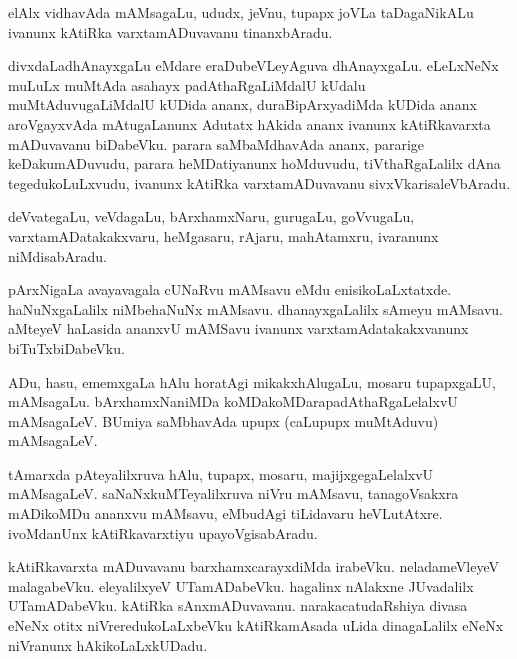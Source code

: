 \documentclass{article}
\begin{document}
\begin{mn}%
elAlx vidhavAda mAMsagaLu, ududx, jeVnu, tupapx joVLa taDagaNikALu ivanunx kAtiRka varxtamADuvavanu 
tinanxbAradu.
\end{mn}

\begin{mn}%
divxdaLadhAnayxgaLu eMdare eraDubeVLeyAguva dhAnayxgaLu. eLeLxNeNx muLuLx muMtAda asahayx 
padAthaRgaLiMdalU kUdalu muMtAduvugaLiMdalU kUDida ananx, duraBipArxyadiMda kUDida ananx 
aroVgayxvAda mAtugaLanunx Adutatx hAkida ananx ivanunx kAtiRkavarxta mADuvavanu biDabeVku. parara 
saMbaMdhavAda ananx, pararige keDakumADuvudu, parara heMDatiyanunx hoMduvudu, tiVthaRgaLalilx dAna 
tegedukoLuLxvudu, ivanunx kAtiRka varxtamADuvavanu sivxVkarisaleVbAradu.
\end{mn}

\begin{mn}%
deVvategaLu, veVdagaLu, bArxhamxNaru, gurugaLu, goVvugaLu, varxtamADatakakxvaru, heMgasaru, rAjaru, 
mahAtamxru, ivaranunx niMdisabAradu.
\end{mn}

\begin{mn}%
pArxNigaLa avayavagala cUNaRvu mAMsavu eMdu enisikoLaLxtatxde. haNuNxgaLalilx niMbehaNuNx mAMsavu. 
dhanayxgaLalilx  sAmeyu mAMsavu. aMteyeV haLasida ananxvU mAMSavu ivanunx varxtamAdatakakxvanunx 
biTuTxbiDabeVku.
\end{mn}

\begin{mn}%
ADu, hasu, ememxgaLa hAlu horatAgi mikakxhAlugaLu, mosaru tupapxgaLU, mAMsagaLu. bArxhamxNaniMDa 
koMDakoMDarapadAthaRgaLelalxvU mAMsagaLeV. BUmiya saMbhavAda upupx (caLupupx muMtAduvu) mAMsagaLeV.
\end{mn}

\begin{mn}%
tAmarxda pAteyalilxruva hAlu, tupapx, mosaru, majijxgegaLelalxvU mAMsagaLeV. saNaNxkuMTeyalilxruva 
niVru mAMsavu, tanagoVsakxra mADikoMDu ananxvu mAMsavu, eMbudAgi tiLidavaru heVLutAtxre. 
ivoMdanUnx kAtiRkavarxtiyu upayoVgisabAradu.
\end{mn}

\begin{mn}%
kAtiRkavarxta mADuvavanu barxhamxcarayxdiMda irabeVku. neladameVleyeV malagabeVku. eleyalilxyeV 
UTamADabeVku. hagalinx nAlakxne JUvadalilx UTamADabeVku. kAtiRka sAnxmADuvavanu. 
narakacatudaRshiya divasa eNeNx otitx niVreredukoLaLxbeVku kAtiRkamAsada uLida dinagaLalilx eNeNx 
niVranunx hAkikoLaLxkUDadu.
\end{mn}
\end{document}
